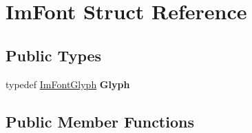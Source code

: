 \hypertarget{struct_im_font}{}\section{Im\+Font Struct Reference}
\label{struct_im_font}
\subsection*{Public Types}
\begin{DoxyCompactItemize}
\item 
\mbox{\label{struct_im_font_a4b802233ac8d3f3beddc395837288683}} 
typedef \hyperlink{struct_im_font_glyph}{Im\+Font\+Glyph} {\bfseries Glyph}
\end{DoxyCompactItemize}
\subsection*{Public Member Functions}
